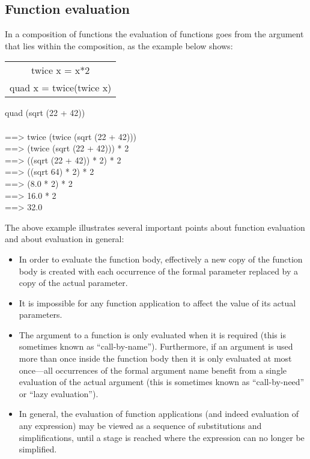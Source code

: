 \documentclass[11pt]{article}
\begin{document}
\subsection{Function evaluation}


In a composition of functions the evaluation of functions goes from the argument that lies within the composition, as the example below shows:

\begin{center}
\begin{tabular}{|c|}
\hline
twice x = x*2\\
quad x = twice(twice x)\\
\hline
\end{tabular}
\end{center}

\begin{flushleft}

quad (sqrt (22 + 42))\\
\\
==> twice (twice (sqrt (22 + 42)))\\
==> (twice (sqrt (22 + 42))) * 2\\
==> ((sqrt (22 + 42)) * 2) * 2\\
==> ((sqrt 64) * 2) * 2\\
==> (8.0 * 2) * 2\\
==> 16.0 * 2\\
==> 32.0
\end{flushleft}

The above example illustrates several important points about function evaluation
and about evaluation in general:\\

\begin{itemize}

\item In order to evaluate the function body, effectively a new copy of the function
body is created with each occurrence of the formal parameter replaced by a
copy of the actual parameter.

\item It is impossible for any function application to affect the value of its actual
parameters.

\item The argument to a function is only evaluated when it is required (this is sometimes known as “call-by-name”). Furthermore, if an argument is used
more than once inside the function body then it is only evaluated at most
once—all occurrences of the formal argument name benefit from a single
evaluation of the actual argument (this is sometimes known as “call-by-need”
or “lazy evaluation”).
\item In general, the evaluation of function applications (and indeed evaluation
of any expression) may be viewed as a sequence of substitutions and simplifications, until a stage is reached where the expression can no longer be
simplified.

\end{itemize}
\end{document}

